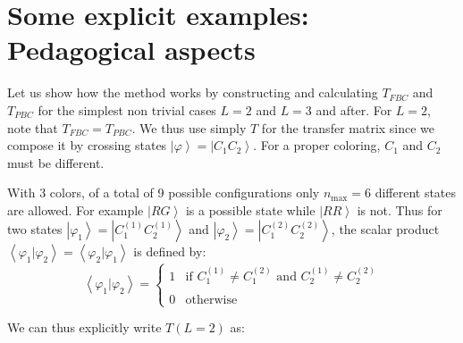 \documentclass[3p, 10pt, onecolumn]{elsarticle}
\begin{document}
\section{Some explicit examples: Pedagogical aspects}

Let us show how the method works by constructing and calculating $T_{FBC}$
and $T_{PBC}$ for the simplest non trivial cases $L=2$ and $L=3$ and after.
For $L=2$, note that $T_{FBC}=T_{PBC}$. We thus use simply $T$ for the
transfer matrix since we compose it by crossing states $\left\vert \varphi
\right\rangle =\left\vert C_{1}C_{2}\right\rangle $. For a proper coloring, $%
C_{1}$ and $C_{2}$ must be different.

With 3 colors, of a total of 9 possible configurations only $n_{\max }=6$
different states are allowed. For example $\left\vert RG\right\rangle $ is a
possible state while $\left\vert RR\right\rangle $ is not. Thus for two
states $\left\vert \varphi _{1}\right\rangle =\left\vert
C_{1}^{(1)}C_{2}^{(1)}\right\rangle $ and $\left\vert \varphi
_{2}\right\rangle =\left\vert C_{1}^{(2)}C_{2}^{(2)}\right\rangle $, the
scalar product $\left\langle \varphi _{1}|\varphi _{2}\right\rangle
=\left\langle \varphi _{2}|\varphi _{1}\right\rangle $ is defined by: 
\begin{equation}
\left\langle \varphi _{1}|\varphi _{2}\right\rangle =\left\{ 
\begin{array}{ll}
1 & \text{if\ }C_{1}^{(1)}\neq C_{1}^{(2)}\text{ and }C_{2}^{(1)}\neq
C_{2}^{(2)} \\ 
&  \\ 
0 & \text{otherwise}%
\end{array}%
\right.
\end{equation}

We can thus explicitly write $T(L=2)$ as:
\end{document}

